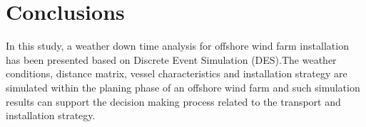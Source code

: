 \section{Conclusions}
In this study, a weather down time analysis for offshore wind farm installation  has been presented based on Discrete Event Simulation (DES).The weather conditions, distance matrix, vessel characteristics and installation strategy are simulated within the planing phase of an offshore wind farm and such simulation results can support the decision making process related to the transport and installation strategy. 
